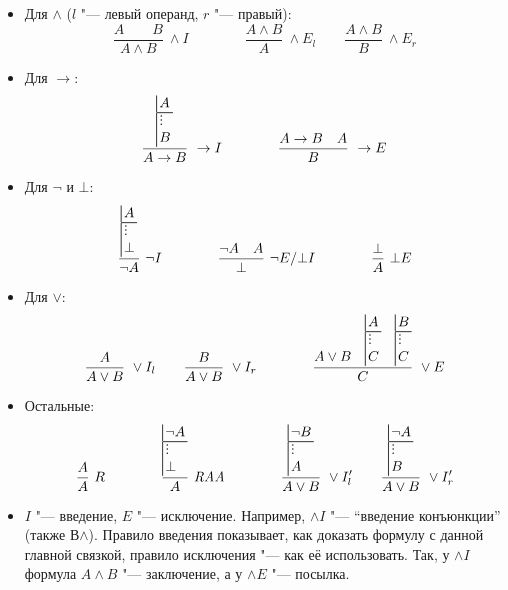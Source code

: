 \documentclass[10pt,a4paper]{article}
\makeatletter
\DeclareRobustCommand{\ndvdots}{%
    \mathord{\vbox{\baselineskip=.3em\lineskiplimit=0pt\kern.15em\hbox{.}\hbox{.}\hbox{.}}}}
\newcommand{\ndsubproof}[2]{{%
    \setlength{\arrayrulewidth}{.2mm}%
    \begin{array}[b]{@{}|@{\,}l@{\,}}#1\\\hline\ndvdots\\#2\end{array}}}
\newcommand{\RAA}{\mathit{RAA}}
\makeatother
\begin{document}
\begin{itemize}
    \item Для $\land$ ($l$ "--- левый операнд, $r$ "--- правый):
    \[
    \frac{A \qquad B}{A \wedge B}\ \wedge I
    \qquad \qquad
    \frac{A \wedge B}{A}\ \wedge E_l
    \qquad
    \frac{A \wedge B}{B}\ \wedge E_r
    \]
    \item Для $\to$:
    \[
    \frac{\ndsubproof{A}{B}}{A \to B}\ \to I
    \qquad \qquad
    \frac{A \to B \quad A}{B}\ \to E
    \]
    \item Для $\neg$ и $\bot$:
    \[
    \frac{\ndsubproof{A}{\bot}}{\neg A}\ \neg I
    \qquad \qquad
    \frac{\neg A \quad A}{\bot}\ \neg E/\bot I
    \qquad \qquad
    \frac{\bot}{A}\ \bot{E}
    \]
    \item Для $\lor$:
    \[
    \frac{A}{A \lor B}\ \lor I_l
    \qquad
    \frac{B}{A \lor B}\ \lor I_r
    \qquad \qquad
    \frac{A \lor B \quad \ndsubproof{A}{C} \quad \ndsubproof{B}{C}}{C}\ \lor E
    \]
    \item Остальные:
    \[
    \frac{A}{A}\ R
    \qquad \qquad
    \frac{\ndsubproof{\neg A}{\bot}}{A}\ \RAA
    \qquad \qquad
    \frac{\ndsubproof{\neg B}{A}}{A \lor B}\ \lor I'_l
    \qquad
    \frac{\ndsubproof{\neg A}{B}}{A \lor B}\ \lor I'_r
    \]
    \item $I$ "--- введение, $E$ "--- исключение. Например, $\land I$ "--- \enquote{введение конъюнкции} (также В$\land$).
    Правило введения показывает, как доказать формулу с данной главной связкой, правило исключения "--- как её использовать. Так, у $\land I$ формула $A\land B$ "--- заключение, а у $\land E$ "--- посылка.
\end{itemize}
\end{document}

